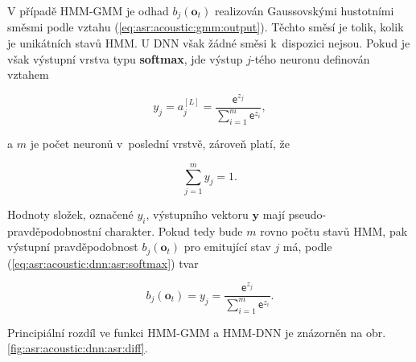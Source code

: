 V případě HMM-GMM je odhad $b_j\left(\boldsymbol{o}_t\right)$ realizován Gaussovskými hustotními směsmi podle vztahu (\ref{eq:asr:acoustic:gmm:output}). Těchto směsí je tolik, kolik je unikátních stavů HMM. U DNN však žádné směsi  k~dispozici nejsou. Pokud je však výstupní vrstva typu \textbf{softmax}, jde výstup $j$-tého neuronu definován vztahem

\begin{equation}
  y_{j} = a_{j}^{[L]} = \frac{\mathsf{e}^{z_j}}{\sum_{i=1}^{m}\mathsf{e}^{z_i}},
  \label{eq:asr:acoustic:dnn:asr:softmax}
\end{equation}

\noindent a $m$ je počet neuronů v~poslední vrstvě, zároveň platí, že

\begin{equation}
  \sum_{j=1}^{m} y_{j} = 1.
  \label{eq:asr:acoustic:dnn:asr:softmax:criterium}
\end{equation}

\noindent Hodnoty složek, označené $y_{i}$, výstupního vektoru $\boldsymbol{y}$ mají pseudo-pravděpodobnostní charakter. Pokud tedy bude $m$ rovno počtu stavů HMM, pak výstupní pravděpodobnost $b_{j} \left(\boldsymbol{o}_t\right)$ pro emitující stav $j$ má, podle (\ref{eq:asr:acoustic:dnn:asr:softmax}) tvar

\begin{equation}
  b_{j} \left(\boldsymbol{o}_t\right) = y_{j} = \frac{\mathsf{e}^{z_j}}{\sum_{i=1}^{m}\mathsf{e}^{z_i}}.
  \label{eq:asr:acoustic:dnn:asr:softmax:criterium}
\end{equation}

\noindent Principiální rozdíl ve funkci HMM-GMM a HMM-DNN je znázorněn na obr. \ref{fig:asr:acoustic:dnn:asr:diff}.

